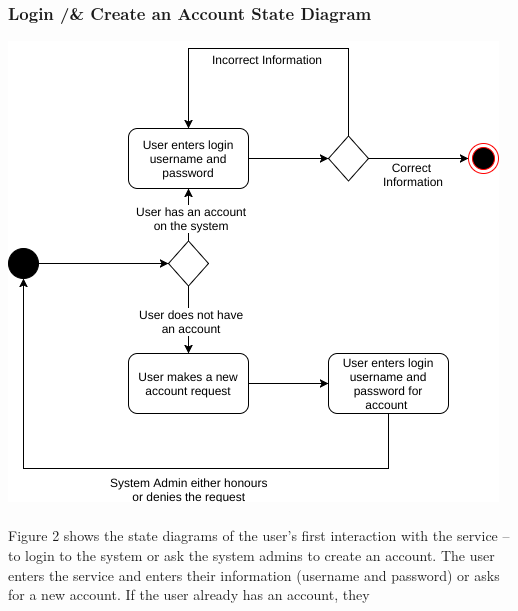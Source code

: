 \documentclass[12pt,oneside,letterpaper]{article}
\begin{document}
\subsubsection{Login /& Create an Account State Diagram}
\includegraphics[scale = 0.7]{Veazey_Login_State.png}
\begingroup
{}
\endgroup

\paragraph{} Figure 2 shows the state diagrams of the user's first interaction with the service -- to login to the system or ask the system admins to create an account. The user enters the service and enters their information (username and password) or asks for a new account. If the user already has an account, they 
\end{document}
